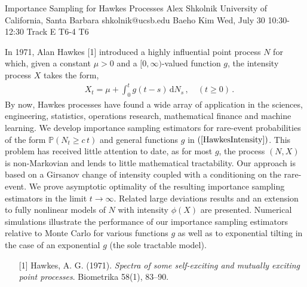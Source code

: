 \begin{talk}
  {Importance Sampling for Hawkes Processes}%
  {Alex Shkolnik}%
  {University of California, Santa Barbara}%
  {shkolnik@ucsb.edu}%
  {Baeho Kim}%
  {}%
  {Wed, July 30 10:30-12:30 Track E}%
  {T6-4}%
  {T6}%
  
				
			
In 1971, Alan Hawkes [1] introduced a highly influential point
process $N$ for which, given a constant $\mu > 0$ and a
$[0,\infty)$-valued function $g$, the intensity process $X$
takes the form,
\begin{align} \label{HawkesIntensity} 
 \quad X_t = \mu + \int_0^t g(t-s) \, \mathrm{d} N_s \, ,
 \quad (t \ge 0) \, .
\end{align}
By now, Hawkes processes have found a wide array of application
in the sciences, engineering, statistics, operations research,
mathematical finance and machine learning. We develop importance
sampling estimators for rare-event probabilities of the form
$\mathbb{P}(N_t \ge c \, t)$ and general functions $g$ in
$(\ref{HawkesIntensity})$. This problem has received little 
attention to
date, as for most $g$, the process $(N,X)$ is
non-Markovian and lends to little mathematical tractability.
Our approach is based on a Girsanov change of intensity coupled
with a conditioning on the rare-event.  We prove asymptotic
optimality of the resulting importance sampling estimators in
the limit $t \to \infty$. Related large deviations results and
an extension to fully nonlinear models of $N$ with intensity
$\phi(X)$ are presented.  Numerical simulations illustrate the
performance of our importance sampling estimators relative to
Monte Carlo for various functions $g$ as well as to exponential
tilting in the case of an exponential $g$ (the sole tractable
model).


\medskip


\begin{enumerate}
	\item[{[1]}] Hawkes, A. G. (1971). {\it Spectra of some 
self-exciting and mutually exciting point processes}. 
Biometrika 58(1), 83–90.
\end{enumerate}


\end{talk}

